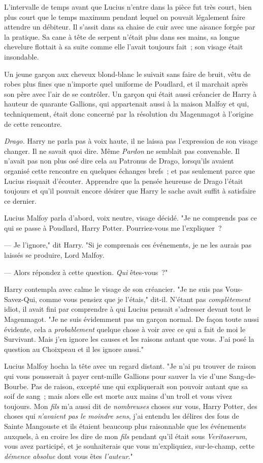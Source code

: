 L'intervalle de temps avant que Lucius n'entre dans la pièce fut très court, bien plus court que le temps maximum pendant lequel on pouvait légalement faire attendre un débiteur. Il s'assit dans sa chaise de cuir avec une aisance forgée par la pratique. Sa cane à tête de serpent n'était plus dans ses mains, sa longue chevelure flottait à sa suite comme elle l'avait toujours fait~; son visage était insondable.

Un jeune garçon aux cheveux blond-blanc le suivait sans faire de bruit, vêtu de robes plus fines que n'importe quel uniforme de Poudlard, et il marchait après son père avec l'air de se contrôler. Un garçon qui était aussi créancier de Harry à hauteur de quarante Gallions, qui appartenait aussi à la maison Malfoy et qui, techniquement, était donc concerné par la résolution du Magenmagot à l'origine de cette rencontre.

\emph{Drago.} Harry ne parla pas à voix haute, il ne laissa pas l'expression de son visage changer. Il ne savait quoi dire. Même \emph{Pardon} ne semblait pas convenable. Il n'avait pas non plus osé dire cela au Patronus de Drago, lorsqu'ils avaient organisé cette rencontre en quelques échanges brefs~; et pas seulement parce que Lucius risquait d'écouter. Apprendre que la pensée heureuse de Drago l'était toujours et qu'il pouvait encore désirer que Harry le sache avait suffit à satisfaire ce dernier.

Lucius Malfoy parla d'abord, voix neutre, visage décidé. "Je ne comprends pas ce qui se passe à Poudlard, Harry Potter. Pourriez-vous me l'expliquer~?

--- Je l'ignore," dit Harry. "Si je comprenais ces événements, je ne les aurais pas laissés se produire, Lord Malfoy.

--- Alors répondez à cette question. \emph{Qui} êtes-vous~?"

Harry contempla avec calme le visage de son créancier. "Je ne suis pas Vous-Savez-Qui, comme vous pensiez que je l'étais," dit-il. N'étant pas \emph{complètement} idiot, il avait fini par comprendre à qui Lucius pensait s'adresser devant tout le Magenmagot. "Je ne suis évidemment pas un garçon normal. De façon toute aussi évidente, cela a \emph{probablement} quelque chose à voir avec ce qui a fait de moi le Survivant. Mais j'en ignore les causes et les raisons autant que vous. J'ai posé la question au Choixpeau et il les ignore aussi."

Lucius Malfoy hocha la tête avec un regard distant. "Je n'ai pu trouver de raison qui vous pousserait à payer cent-mille Gallions pour sauver la vie d'une Sang-de-Bourbe. Pas de raison, excepté une qui expliquerait son pouvoir autant que sa soif de sang~; mais alors elle est morte aux mains d'un troll et vous vivez toujours. Mon \emph{fils} m'a aussi dit de \emph{nombreuses} choses sur vous, Harry Potter, des choses qui \emph{n'avaient pas le moindre sens}, j'ai entendu les délires des fous de Sainte Mangouste et ils étaient beaucoup plus raisonnable que les événements auxquels, à en croire les dire de mon \emph{fils} pendant qu'il était sous \emph{Veritaserum}, vous avez participé, et je souhaiterais que vous m'expliquiez, sur-le-champ, cette \emph{démence absolue} dont vous êtes \emph{l'auteur}."

